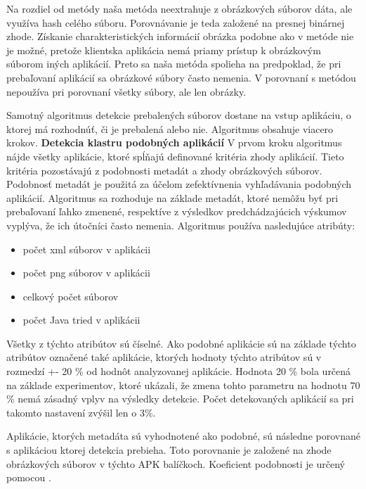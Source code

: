 Na rozdiel od metódy  naša metóda neextrahuje z obrázkových súborov dáta, ale využíva hash celého súboru. Porovnávanie je teda založené na presnej binárnej zhode. Získanie charakteristických informácií obrázka podobne ako v metóde  nie je možné, pretože klientska aplikácia nemá priamy prístup k obrázkovým súborom iných aplikácií. Preto sa naša metóda spolieha na predpoklad, že pri prebaľovaní aplikácií sa obrázkové súbory často nemenia. 
V porovnaní s metódou  nepoužíva  pri porovnaní všetky súbory, ale len  obrázky.

Samotný algoritmus detekcie prebalených súborov dostane na vstup aplikáciu, o ktorej má rozhodnúť, či je prebalená alebo nie. Algoritmus obsahuje viacero krokov.
\newline \newline
\noindent \textbf{Detekcia klastru podobných aplikácií} \newline \newline
\noindent V prvom kroku algoritmus nájde všetky aplikácie, ktoré spĺňajú definované kritéria zhody aplikácií. Tieto kritéria pozostávajú z podobnosti metadát a zhody obrázkových súborov. 
Podobnosť metadát je použitá za účelom zefektívnenia vyhľadávania podobných aplikácií. Algoritmus sa rozhoduje na základe metadát, ktoré nemôžu byť pri prebaľovaní ľahko zmenené, respektíve z výsledkov predchádzajúcich výskumov vyplýva, že ich útočníci často nemenia. \newline \noindent Algoritmus používa nasledujúce atribúty:
\begin{itemize}
	\item počet xml súborov v aplikácii
	\item počet png súborov v aplikácii
	\item celkový počet súborov
	\item počet Java tried v aplikácii
\end{itemize}

Všetky z týchto atribútov sú číselné. Ako podobné aplikácie sú na základe týchto atribútov označené také aplikácie, ktorých hodnoty týchto atribútov sú v rozmedzí +- 20 \% od hodnôt analyzovanej aplikácie. Hodnota 20 \% bola určená na základe experimentov, ktoré ukázali, že zmena tohto parametru na hodnotu 70 \% nemá zásadný vplyv na výsledky detekcie. Počet detekovaných aplikácií sa pri takomto nastavení zvýšil len o 3\%. 

Aplikácie, ktorých metadáta sú vyhodnotené ako podobné, sú následne porovnané s aplikáciou ktorej detekcia prebieha. Toto porovnanie je založené na zhode obrázkových  súborov v týchto APK balíčkoch.  Koeficient podobnosti je určený pomocou .

